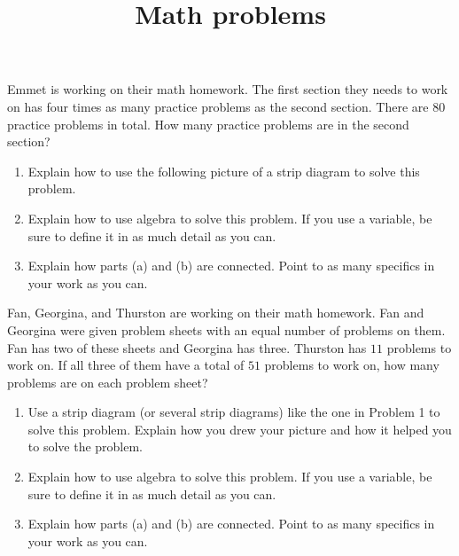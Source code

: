\documentclass[nooutcomes,noauthor]{ximera}
\title{Math problems}
\begin{document}
\begin{abstract}
\end{abstract}

\maketitle

\begin{problem}
Emmet is working on their math homework. The first section they needs to work on has four times as many practice problems as the second section. There are $80$ practice problems in total. How many practice problems are in the second section?

\begin{enumerate}
	\item Explain how to use the following picture of a strip diagram to solve this problem.
	\begin{image} \end{image}
	\item Explain how to use algebra to solve this problem. If you use a variable, be sure to define it in as much detail as you can.
	\item Explain how parts (a) and (b) are connected. Point to as many specifics in your work as you can.
\end{enumerate}

\end{problem}



\begin{problem}
Fan, Georgina, and Thurston are working on their math homework. Fan and Georgina were given problem sheets with an equal number of problems on them. Fan has two of these sheets and Georgina has three. Thurston has $11$ problems to work on. If all three of them have a total of $51$ problems to work on, how many problems are on each problem sheet?

\begin{enumerate}
	\item Use a strip diagram (or several strip diagrams) like the one in Problem 1 to solve this problem. Explain how you drew your picture and how it helped you to solve the problem.
	\item Explain how to use algebra to solve this problem. If you use a variable, be sure to define it in as much detail as you can.
	\item Explain how parts (a) and (b) are connected. Point to as many specifics in your work as you can.
\end{enumerate}
\end{problem}
\end{document}
